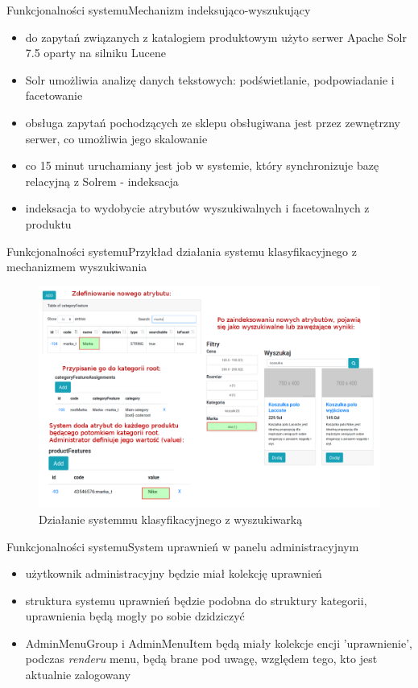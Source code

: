 \documentclass[polish,xcolor=table,9pt,aspectratio=1610,hyperref={pdfpagemode=FullScreen}]{beamer}
\begin{document}
\begin{frame}{Funkcjonalności systemu}{Mechanizm indeksująco-wyszukujący}
\begin{itemize}
	\item<1-> do zapytań związanych z katalogiem produktowym użyto serwer Apache Solr 7.5 oparty na silniku Lucene
	\item<1-> Solr umożliwia analizę danych tekstowych: podświetlanie, podpowiadanie i facetowanie 
	\item<1-> obsługa zapytań pochodzących ze sklepu obsługiwana jest przez zewnętrzny serwer, co umożliwia jego skalowanie
	\item<1-> co 15 minut uruchamiany jest job w systemie, który synchronizuje bazę relacyjną z Solrem - indeksacja
	\item<1-> indeksacja to wydobycie atrybutów wyszukiwalnych i facetowalnych z produktu
\end{itemize}
\end{frame}

\begin{frame}{Funkcjonalności systemu}{Przykład działania systemu klasyfikacyjnego z mechanizmem wyszukiwania}
	\begin{figure}
		\begin{center}
			\includegraphics[scale=0.3]{sysklas-wyszfacet.png}
		\end{center}
		\caption{{\color{black}Działanie systemmu klasyfikacyjnego z wyszukiwarką}} 
	\end{figure}
\end{frame}


\begin{frame}{Funkcjonalności systemu}{System uprawnień w panelu administracyjnym}
\begin{itemize}
	\item<1-> użytkownik administracyjny będzie miał kolekcję uprawnień
	\item<1-> struktura systemu uprawnień będzie podobna do struktury kategorii, uprawnienia będą mogły po sobie dzidziczyć
	\item<1-> AdminMenuGroup i AdminMenuItem będą miały kolekcje encji 'uprawnienie', podczas \textit{renderu} menu, będą brane pod uwagę, względem tego, kto jest aktualnie zalogowany
\end{itemize}
\end{frame}
\end{document}
